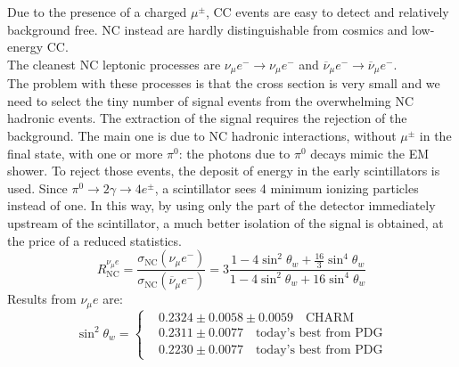 \documentclass[10.75pt,a4paper,openright,bottom=2cm]{article}
\begin{document}
Due to the presence of a charged $\mu^\pm$, CC events are easy to detect and relatively background free. NC instead are hardly distinguishable from cosmics and low-energy CC.\\
The cleanest NC leptonic processes are $\nu_\mu e^-\to\nu_\mu e^-$ and $\overline{\nu}_\mu e^-\to\overline{\nu}_\mu e^-$.\\
The problem with these processes is that the cross section is very small and we need to select the tiny number of signal events from the overwhelming NC hadronic events. The extraction of the signal requires the rejection of the background. The main one is due to NC hadronic interactions, without $\mu^\pm$ in the final state, with one or more $\pi^0$: the photons due to $\pi^0$ decays mimic the EM shower. To reject those events, the deposit of energy in the early scintillators is used. Since $\pi^0\to2\gamma\to4e^\pm$, a scintillator sees 4 minimum ionizing particles instead of one. In this way, by using only the part of the detector immediately upstream of the scintillator, a much better isolation of the signal is obtained, at the price of a reduced statistics. 
\[
R_{\text{NC}}^{\nu_\mu e}=\frac{\sigma_{\text{NC}}(\nu_\mu e^-)}{\sigma_{\text{NC}}(\overline{\nu}_\mu e^-)}=3\frac{1-4\sin^2\theta_w+\frac{16}{3}\sin^4\theta_w}{1-4\sin^2\theta_w+16\sin^4\theta_w}
\]
Results from $\nu_\mu e$ are:
\[
\sin^2\theta_w=
\left\{
\begin{aligned}
&0.2324\pm0.0058\pm0.0059 \quad \text{CHARM}\\
&0.2311\pm0.0077 \quad \text{today's best from PDG}\\
&0.2230\pm0.0077 \quad \text{today's best from PDG}
\end{aligned}
\right.
\]
\end{document}
